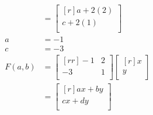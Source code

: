\documentclass[12pt]{article}
\theoremstyle{definition}
\theoremstyle{plain}
\begin{document}
\begin{enumerate}
\begin{align*}
	&= \begin{bmatrix}[r]a+2(2)\\c+2(1)\\\end{bmatrix}\\
	a&=-1\\
	c&=-3\\
	F(a,b) &= \begin{bmatrix}[rr]-1&2\\-3&1\\\end{bmatrix}\begin{bmatrix}[r]x\\y\\\end{bmatrix}\\
	&= \begin{bmatrix}[r]ax+by\\cx+dy\\\end{bmatrix}
	\end{align*}



\end{enumerate}
\end{document}
